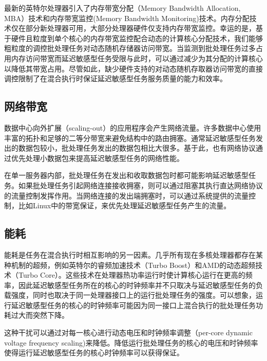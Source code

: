 最新的英特尔处理器引入了内存带宽分配（Memory Bandwidth Allocation, MBA）技术和内存带宽监控(Memory Bandwidth Monitoring)技术\cite{iyer2007qos}\cite{guide2011intel}。内存分配技术仅在部分新处理器可用，大部分处理器硬件仅支持内存带宽监控\cite{guide2011intel}。幸运的是，基于硬件且粒度到单个核心的内存带宽监控配合动态的计算核心分配技术，我们能够粗粒度的调控批处理任务对动态随机存储器访问带宽\cite{lo2015heracles}。当监测到批处理任务过多占用内存访问带宽而延迟敏感型任务受限与此时，可以通过减少为其分配的计算核心以降低其带宽占用。尽管如此，缺少硬件支持的对动态随机存取器访问带宽的直接调控限制了在混合执行时保证延迟敏感型任务服务质量的能力和效率。

\subsection{网络带宽}
数据中心向外扩展（scaling-out）的应用程序会产生网络流量。许多数据中心使用丰富的拓扑和足够的二等分带宽来避免结构中的路由拥塞\cite{al2008scalable}\cite{issariyakul2011introduction}。通常延迟敏感型任务发出的数据包较小，批处理任务发出的数据包相比大很多。基于此，也有网络协议通过优先处理小数据包来提高延迟敏感型任务的网络性能\cite{wilson2011better}\cite{alizadeh2010data}。

在单一服务器内部，批处理任务在发出和收取数据包时都可能影响延迟敏感型任务。如果批处理任务引起网络连接接收拥塞，则可以通过阻塞其执行直达网络协议的流量控制发挥作用\cite{podlesny2012solving}。当网络连接的发出端拥塞时，可以通过系统提供的流量控制，比如Linux中的带宽保证，来优先处理延迟敏感型任务产生的流量\cite{brown2006traffic}。


\subsection{能耗}
能耗是任务在混合执行时相互影响的另一因素。几乎所有现在多核处理器都存在某种机制的超频，例如英特尔的睿频加速技术（Turbo Boost）和AMD的动态超频技术（Turbo Core）。这些技术在处理器热功率运行时使计算核心运行在更高的频率，因此延迟敏感型任务所在的核心的时钟频率并不只取决与延迟敏感型任务的负载强度，同时也取决于同一处理器接口上的运行批处理任务的强度。可以想象，运行延迟敏感型任务的核心的时钟频率可能因为同一接口上混合执行的批处理任务功耗过大而突然下降。

这种干扰可以通过对每一核心进行动态电压和时钟频率调整（per-core dynamic voltage frequency scaling)来降低。降低运行批处理任务的核心的电压和时钟频率使得运行延迟敏感型任务的核心时钟频率可以获得保证。





